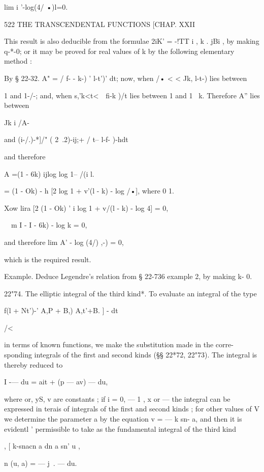 lim i '-log(4/ •)l=0. 



522 THE TRANSCENDENTAL FUNCTIONS [CHAP. XXII 

This result is also deducible from the formulae 2iK' = -!TT i , k . jBi , by making 
q-*-0; or it may be proved for real values of k by the following elementary method : 

By § 22-32. A" = /  f- - k-) '    l-t')' dt; now, when /• <   < Jk,  l-t-) lies between 

1 and 1-/-; and, when s,'k<t<\ \    fi-k )/t  lies between 1 and 1 ~k. Therefore A'' lies 
between 

Jk i /A- 

and (i-/.)-*]/"  ( 2\  .2)-ij;+ / t--  l-f- )-hdt\; 

and therefore 

A =(1 - 6k) ijlog   log 1-- /(i l.   

= (1 - Ok) - h [2 log  1 + v'(l - k)  - log /•], 
where 0   1. 

Xow lira [2 (1 - Ok) ' i log  1 + v/(l - k)  - log 4] = 0, 

\ \  m  I -  I - 6k) -  log k = 0, 

and therefore lim  A' - log (4/) ,-)  = 0, 

which is the required result. 

Example. Deduce Legendre's relation from § 22-736 example 2, by making k- 0. 

22"74. The elliptic integral of the third kind*. 
To evaluate an integral of the type 

f(l + Nt')-'   A,P + B,)  A,t'+B. ] -   dt 



/< 



in terms of known functions, we make the substitution made in the corre- 
sponding integrals of the first and second kinds (§§ 22*72, 22"73). The 
integral is thereby reduced to 

I -— du = ait + (p — av) — du, 

where or, yS, v are constants ; if i  = 0, — 1 , x or —   the integral can be 
expressed in terais of integrals of the first and second kinds ; for other values 
of V we determine the parameter a by the equation v = — k  sn- a, and then it 
is evidentl ' permissible to take as the fundamental integral of the third kind 

  ,   [  k-snacn a dn a sn'  u , 

n (u, a) = — j~. — du. 

